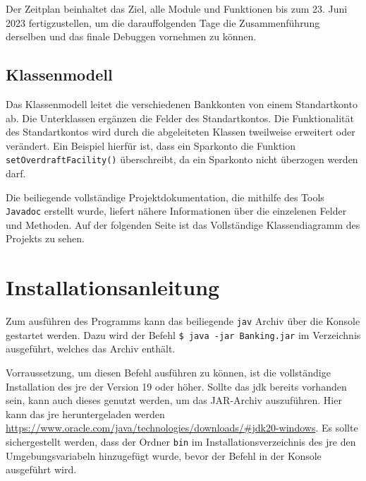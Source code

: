 \documentclass[
	12pt,
	a4paper,
	hidelinks
	]{report}
\newcommand{\code}[1]{\texttt{#1}}
\begin{document}
Der Zeitplan beinhaltet das Ziel, alle Module und Funktionen bis zum 23. Juni 2023 fertigzustellen, um die darauffolgenden Tage die Zusammenführung derselben und das finale Debuggen vornehmen zu können.

\subsection{Klassenmodell}
\begin{figure}[!h]
\end{figure}
Das Klassenmodell leitet die verschiedenen Bankkonten von einem Standartkonto ab. Die Unterklassen ergänzen die Felder des Standartkontos. Die Funktionalität des Standartkontos wird durch die abgeleiteten Klassen tweilweise erweitert oder verändert. Ein Beispiel hierfür ist, dass ein Sparkonto die Funktion \code{setOverdraftFacility()} überschreibt, da ein Sparkonto nicht überzogen werden darf.

Die beiliegende vollständige Projektdokumentation, die mithilfe des Tools \code{Javadoc} erstellt wurde, liefert nähere Informationen über die einzelenen Felder und Methoden. Auf der folgenden Seite ist das Vollständige Klassendiagramm des Projekts zu sehen.



\section{Installationsanleitung}
Zum ausführen des Programms kann das beiliegende \code{jav} Archiv über die Konsole gestartet werden. Dazu wird der Befehl \code{\$ java -jar Banking.jar} im Verzeichnis ausgeführt, welches das Archiv enthält.

Vorraussetzung, um diesen Befehl ausführen zu können, ist die vollständige Installation des \ac{jre} der Version 19 oder höher. Sollte das \ac{jdk} bereits vorhanden sein, kann auch dieses genutzt werden, um das JAR-Archiv auszuführen. Hier kann das \ac{jre} heruntergeladen werden \url{https://www.oracle.com/java/technologies/downloads/#jdk20-windows}. Es sollte sichergestellt werden, dass der Ordner \code{bin} im Installationsverzeichnis des \ac{jre} den Umgebungsvariabeln hinzugefügt wurde, bevor der Befehl in der Konsole ausgeführt wird.
\end{document}
